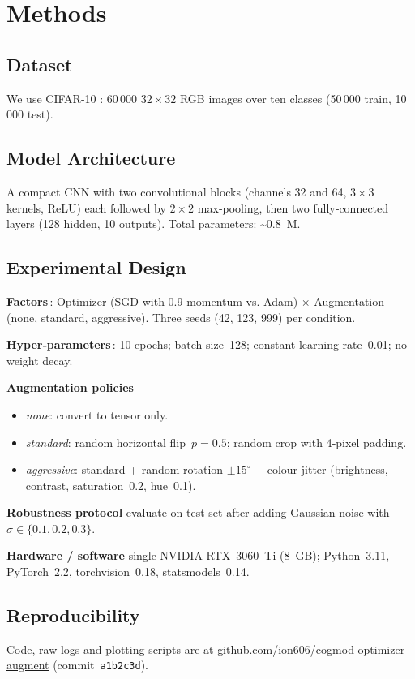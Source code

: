 \documentclass{article}
\begin{document}
\section{Methods}

\subsection{Dataset}
We use CIFAR‑10 \cite{krizhevsky2009learning}: 60\,000 $32\times32$ RGB images over ten classes (50\,000 train, 10\,000 test).

\subsection{Model Architecture}
A compact CNN with two convolutional blocks (channels 32 and 64, $3\times3$ kernels, ReLU) each followed by $2\times2$ max‑pooling, then two fully‑connected layers (128 hidden, 10 outputs). Total parameters: \textasciitilde0.8 M.

\subsection{Experimental Design}
\textbf{Factors}\,:  Optimizer (SGD with 0.9 momentum vs. Adam) $\times$ Augmentation (none, standard, aggressive).  Three seeds (42, 123, 999) per condition.

\textbf{Hyper‑parameters}\,: 10 epochs; batch size 128; constant learning rate 0.01; no weight decay.

\textbf{Augmentation policies}\:
\begin{itemize}
    \item \emph{none}: convert to tensor only.
    \item \emph{standard}: random horizontal flip $p=0.5$; random crop with 4‑pixel padding.
    \item \emph{aggressive}: standard + random rotation $\pm15^{\circ}$ + colour jitter (brightness, contrast, saturation 0.2, hue 0.1).
\end{itemize}

\textbf{Robustness protocol}\: evaluate on test set after adding Gaussian noise with $\sigma\in\{0.1, 0.2, 0.3\}$.

\textbf{Hardware / software}\: single NVIDIA RTX 3060 Ti (8 GB); Python 3.11, PyTorch 2.2, torchvision 0.18, statsmodels 0.14.

\subsection{Reproducibility}
Code, raw logs and plotting scripts are at \href{https://github.com/ion606/cogmod-optimizer-augment}{github.com/ion606/cogmod-optimizer-augment} (commit~\texttt{a1b2c3d}).
\end{document}
